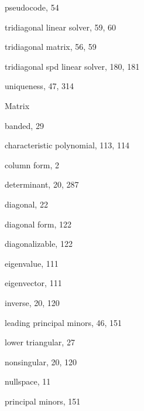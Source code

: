 {\noindent\hspace*{1.4em}pseudocode, 54

\noindent\hspace*{1.4em}tridiagonal linear solver, 59, 60

\noindent\hspace*{1.4em}tridiagonal matrix, 56, 59

\noindent\hspace*{1.4em}tridiagonal spd linear solver, 180, 181

\noindent\hspace*{1.4em}uniqueness, 47, 314

\medskip
\noindent Matrix

\noindent\hspace*{1.4em}banded, 29

\noindent\hspace*{1.4em}characteristic polynomial, 113, 114

\noindent\hspace*{1.4em}column form, 2

\noindent\hspace*{1.4em}determinant, 20, 287

\noindent\hspace*{1.4em}diagonal, 22

\noindent\hspace*{1.4em}diagonal form, 122

\noindent\hspace*{1.4em}diagonalizable, 122

\noindent\hspace*{1.4em}eigenvalue, 111

\noindent\hspace*{1.4em}eigenvector, 111

\noindent\hspace*{1.4em}inverse, 20, 120

\noindent\hspace*{1.4em}leading principal minors, 46, 151

\noindent\hspace*{1.4em}lower triangular, 27

\noindent\hspace*{1.4em}nonsingular, 20, 120

\noindent\hspace*{1.4em}nullspace, 11

\noindent\hspace*{1.4em}principal minors, 151

}

